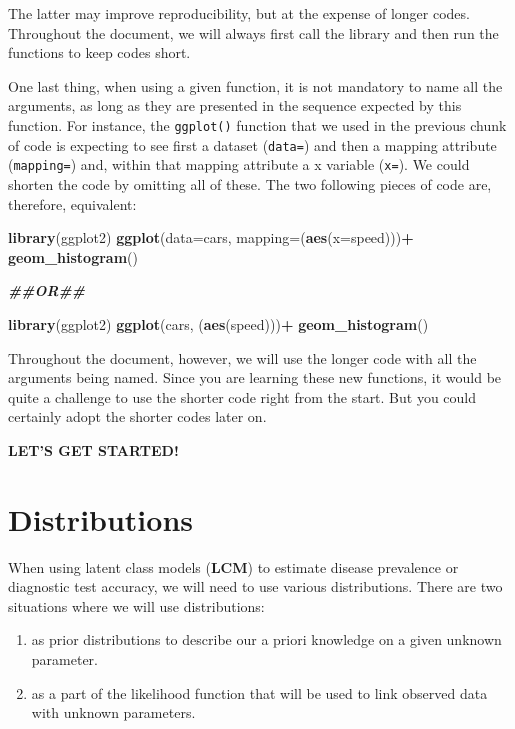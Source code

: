 \documentclass[
]{book}
\newenvironment{Shaded}{\begin{snugshade}}{\end{snugshade}}
\newcommand{\AttributeTok}[1]{\textcolor[rgb]{0.13,0.29,0.53}{#1}}
\newcommand{\DocumentationTok}[1]{\textcolor[rgb]{0.56,0.35,0.01}{\textbf{\textit{#1}}}}
\newcommand{\FunctionTok}[1]{\textcolor[rgb]{0.13,0.29,0.53}{\textbf{#1}}}
\newcommand{\NormalTok}[1]{#1}
\newcommand{\SpecialCharTok}[1]{\textcolor[rgb]{0.81,0.36,0.00}{\textbf{#1}}}
\providecommand{\tightlist}{%
  \setlength{\itemsep}{0pt}\setlength{\parskip}{0pt}}
\begin{document}
The latter may improve reproducibility, but at the expense of longer codes. Throughout the document, we will always first call the library and then run the functions to keep codes short.

One last thing, when using a given function, it is not mandatory to name all the arguments, as long as they are presented in the sequence expected by this function. For instance, the \texttt{ggplot()} function that we used in the previous chunk of code is expecting to see first a dataset (\texttt{data=}) and then a mapping attribute (\texttt{mapping=}) and, within that mapping attribute a x variable (\texttt{x=}). We could shorten the code by omitting all of these. The two following pieces of code are, therefore, equivalent:

\begin{Shaded}
\begin{Highlighting}[]
\FunctionTok{library}\NormalTok{(ggplot2)}
\FunctionTok{ggplot}\NormalTok{(}\AttributeTok{data=}\NormalTok{cars, }\AttributeTok{mapping=}\NormalTok{(}\FunctionTok{aes}\NormalTok{(}\AttributeTok{x=}\NormalTok{speed)))}\SpecialCharTok{+}
  \FunctionTok{geom\_histogram}\NormalTok{()}

\DocumentationTok{\#\#OR\#\#  }

\FunctionTok{library}\NormalTok{(ggplot2)}
\FunctionTok{ggplot}\NormalTok{(cars, (}\FunctionTok{aes}\NormalTok{(speed)))}\SpecialCharTok{+}
  \FunctionTok{geom\_histogram}\NormalTok{()}
\end{Highlighting}
\end{Shaded}

Throughout the document, however, we will use the longer code with all the arguments being named. Since you are learning these new functions, it would be quite a challenge to use the shorter code right from the start. But you could certainly adopt the shorter codes later on.

\textbf{LET'S GET STARTED!}

\chapter{Distributions}\label{distributions}

When using latent class models (\textbf{LCM}) to estimate disease prevalence or diagnostic test accuracy, we will need to use various distributions. There are two situations where we will use distributions:

\begin{enumerate}
\def\labelenumi{\arabic{enumi})}
\tightlist
\item
  as prior distributions to describe our a priori knowledge on a given unknown parameter.\\
\item
  as a part of the likelihood function that will be used to link observed data with unknown parameters.
\end{enumerate}
\end{document}
